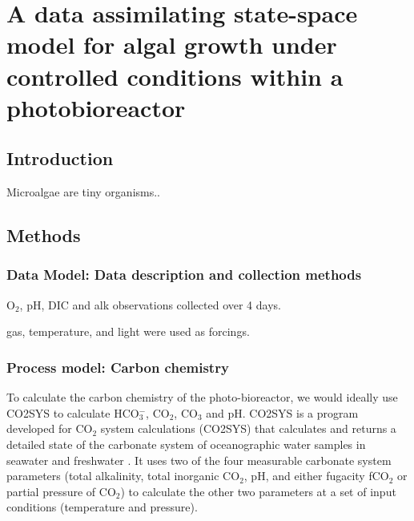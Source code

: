 \documentclass{ruthesis}
\begin{document}
\tableofcontents


\setcounter{chapter}{3}
\chapter{A data assimilating state-space model for algal growth under controlled conditions within a photobioreactor}\label{ch:Intro}


\section{Introduction}\label{sec:micro_intro} 

Microalgae are tiny organisms.. 









\section{Methods}

\subsection{Data Model: Data description and collection methods}

O$_2$, pH, DIC and alk observations collected over 4 days.


gas, temperature, and light were used as forcings.



\subsection{Process model: Carbon chemistry}

To calculate the carbon chemistry of the photo-bioreactor, we would ideally use CO2SYS \cite{lewis1998program} to calculate HCO$_3^-$, CO$_2$, CO$_3$ and pH. 
CO2SYS is a program developed for CO$_2$ system calculations (CO2SYS) that calculates and returns a detailed state of the carbonate system of oceanographic water samples in seawater and freshwater \cite{lewis1998program}.
It uses two of the four measurable carbonate system parameters (total alkalinity, total inorganic CO$_2$, pH, and either fugacity fCO$_2$ or partial pressure of CO$_2$) to calculate the other two parameters at a set of input conditions (temperature and pressure). 
\end{document}
